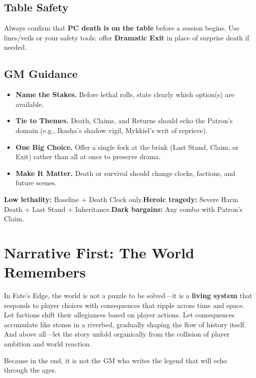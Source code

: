 \subsection*{Table Safety}\label{subsec:death-safety}
Always confirm that \textbf{PC death is on the table} before a session begins. Use lines/veils or your safety tools; offer \textbf{Dramatic Exit} in place of surprise death if needed.

\subsection*{GM Guidance}\label{subsec:death-gm}
\begin{itemize}
\item \textbf{Name the Stakes.} Before lethal rolls, state clearly which option(s) are available.
\item \textbf{Tie to Themes.} Death, Claims, and Returns should echo the Patron’s domain (e.g., Ikasha’s shadow vigil, Mykkiel’s writ of reprieve).
\item \textbf{One Big Choice.} Offer a single fork at the brink (Last Stand, Claim, or Exit) rather than all at once to preserve drama.
\item \textbf{Make It Matter.} Death or survival should change clocks, factions, and future scenes.
\end{itemize}

\begin{tcolorbox}[title={Quick Picks},colback=gray!5,colframe=black]
\small \textbf{Low lethality:} Baseline + Death Clock only.\quad \textbf{Heroic tragedy:} Severe Harm Death + Last Stand + Inheritance.\quad \textbf{Dark bargains:} Any combo with Patron’s Claim.\end{tcolorbox}

\section*{Narrative First: The World Remembers}

In Fate's Edge, the world is not a puzzle to be solved---it is a \textbf{living system} that responds to player choices with consequences that ripple across time and space. Let factions shift their allegiances based on player actions. Let consequences accumulate like stones in a riverbed, gradually shaping the flow of history itself. And above all---let the story unfold organically from the collision of player ambition and world reaction.

Because in the end, it is not the GM who writes the legend that will echo through the ages.

